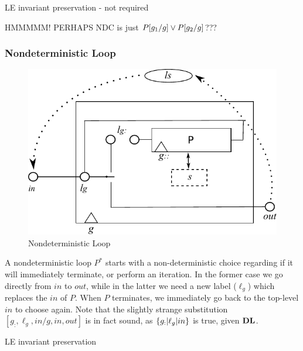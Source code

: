 LE invariant preservation - not required

HMMMMM! PERHAPS NDC is just $P[g_{1}/g] \lor P[g_{2}/g]$???


\subsubsection{Nondeterministic Loop}

\begin{figure}
  \centering
  \includegraphics{images/kleene-star-actual}
  \caption{Nondeterministic Loop}
  \label{fig:nondet-loop}
\end{figure}

A nondeterministic loop $P^*$  starts with a non-deterministic choice
regarding if it will immediately terminate,
or perform an iteration.
In the former case we go directly from $in$ to $out$,
while in the latter we need a new label ($\ell_g$)
which replaces the $in$ of $P$.
When $P$ terminates, we immediately go back to the top-level $in$
to choose again.
Note that the slightly strange substitution $[g_{:},\ell_g,in/g,in,out]$
is in fact sound, as $\{g_{:}|\ell_g|in\}$ is true, given $\mathbf{DL}$.

LE invariant preservation


